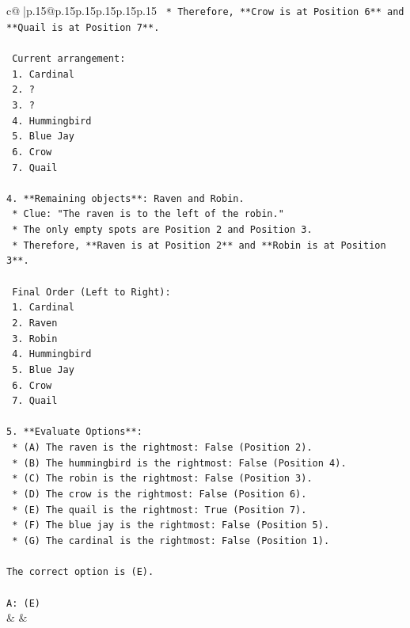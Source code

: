 \documentclass{article}
\begin{document}
{\begin{supertabular}{c@{$\;$}|p{.15\linewidth}@{}p{.15\linewidth}p{.15\linewidth}p{.15\linewidth}p{.15\linewidth}p{.15\linewidth}}
{{{\texttt{        *   Therefore, **Crow is at Position 6** and **Quail is at Position 7**.} \\
\\ 
\texttt{    Current arrangement:} \\
\texttt{    1.  Cardinal} \\
\texttt{    2.  ?} \\
\texttt{    3.  ?} \\
\texttt{    4.  Hummingbird} \\
\texttt{    5.  Blue Jay} \\
\texttt{    6.  Crow} \\
\texttt{    7.  Quail} \\
\\ 
\texttt{4.  **Remaining objects**: Raven and Robin.} \\
\texttt{    *   Clue: "The raven is to the left of the robin."} \\
\texttt{    *   The only empty spots are Position 2 and Position 3.} \\
\texttt{    *   Therefore, **Raven is at Position 2** and **Robin is at Position 3**.} \\
\\ 
\texttt{    Final Order (Left to Right):} \\
\texttt{    1.  Cardinal} \\
\texttt{    2.  Raven} \\
\texttt{    3.  Robin} \\
\texttt{    4.  Hummingbird} \\
\texttt{    5.  Blue Jay} \\
\texttt{    6.  Crow} \\
\texttt{    7.  Quail} \\
\\ 
\texttt{5.  **Evaluate Options**:} \\
\texttt{    *   (A) The raven is the rightmost: False (Position 2).} \\
\texttt{    *   (B) The hummingbird is the rightmost: False (Position 4).} \\
\texttt{    *   (C) The robin is the rightmost: False (Position 3).} \\
\texttt{    *   (D) The crow is the rightmost: False (Position 6).} \\
\texttt{    *   (E) The quail is the rightmost: True (Position 7).} \\
\texttt{    *   (F) The blue jay is the rightmost: False (Position 5).} \\
\texttt{    *   (G) The cardinal is the rightmost: False (Position 1).} \\
\\ 
\texttt{The correct option is (E).} \\
\\ 
\texttt{A: (E)} \\
            }
        }
    }
    & & \\ \\


\end{supertabular}}
\end{document}
